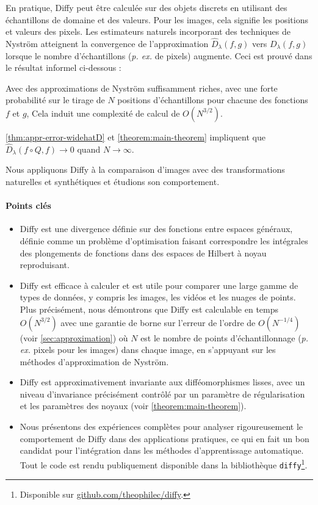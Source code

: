En pratique, Diffy peut être calculée sur des objets discrets en utilisant des échantillons de domaine et des valeurs. Pour les images, cela signifie les positions et valeurs des pixels. Les estimateurs naturels incorporant des techniques de Nyström atteignent la convergence de l'approximation $\hat D_\lambda(f, g)$ vers $D_\lambda(f, g)$ lorsque le nombre d'échantillons (\emph{p. ex.} de pixels) augmente. Ceci est prouvé dans le résultat informel ci-dessous :
\begin{mdframed}
\begin{informaltheorem}
Avec des approximations de Nyström suffisamment riches, avec une forte probabilité sur le tirage de $N$ positions d'échantillons pour chacune des fonctions $f$ et $g$,
Cela induit une complexité de calcul de $O(N^{3/2})$.
\end{informaltheorem}
\end{mdframed}
\noindent \cref{thm:appr-error-widehatD} et \cref{theorem:main-theorem} impliquent que $\hat D_\lambda(f\circ Q, f)\to 0$ quand $N\to \infty$.

Nous appliquons Diffy à la comparaison d'images avec des transformations naturelles et synthétiques et étudions son comportement.

\paragraph{Points clés}

\begin{itemize}
    \item Diffy est une divergence définie sur des fonctions entre espaces généraux, définie comme un problème d'optimisation faisant correspondre les intégrales des plongements de fonctions dans des espaces de Hilbert à noyau reproduisant.
    \item Diffy est efficace à calculer et est utile pour comparer une large gamme de types de données, y compris les images, les vidéos et les nuages de points. Plus précisément, nous démontrons que Diffy est calculable en temps $O(N^{3/2})$ avec une garantie de borne sur l'erreur de l'ordre de $O(N^{-1/4})$ (voir \cref{sec:approximation}) où $N$ est le nombre de points d'échantillonnage (\emph{p. ex.} pixels pour les images) dans chaque image, en s'appuyant sur les méthodes d'approximation de Nyström.
    \item Diffy est approximativement invariante aux difféomorphismes lisses, avec un niveau d'invariance précisément contrôlé par un paramètre de régularisation et les paramètres des noyaux (voir \cref{theorem:main-theorem}).
    \item Nous présentons des expériences complètes pour analyser rigoureusement le comportement de Diffy dans des applications pratiques, ce qui en fait un bon candidat pour l'intégration dans les méthodes d'apprentissage automatique. Tout le code est rendu publiquement disponible dans la bibliothèque \texttt{diffy}\footnote{Disponible sur \url{github.com/theophilec/diffy}.}.
\end{itemize}


